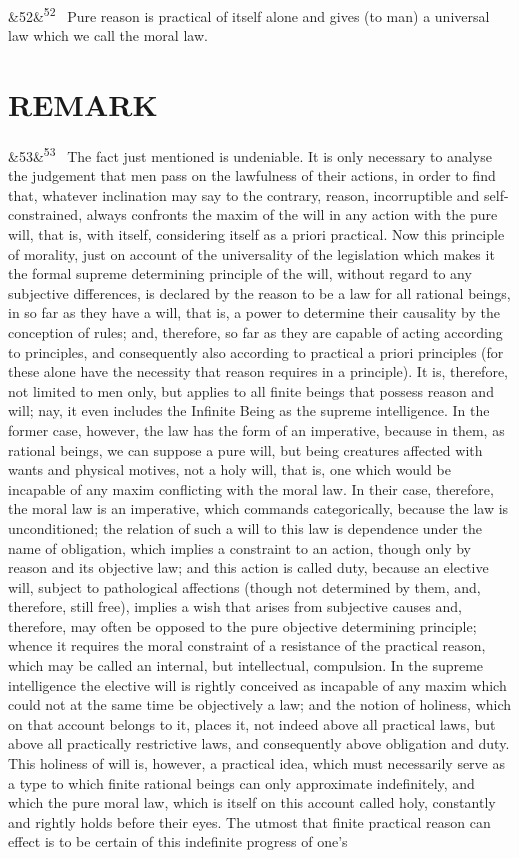\documentclass[12pt]{article}
\newcommand{\para}[1][]{\par\noindent\ifx&#1&\else\textsuperscript{\footnotesize #1}~\fi}
\begin{document}
\para[52] Pure reason is practical of itself alone and gives (to man) a universal law which we call the moral law.

\section*{REMARK}

\para[53] The fact just mentioned is undeniable. It is only necessary to analyse the judgement that men pass on the lawfulness of their actions, in order to find that, whatever inclination may say to the contrary, reason, incorruptible and self-constrained, always confronts the maxim of the will in any action with the pure will, that is, with itself, considering itself as a priori practical. Now this principle of morality, just on account of the universality of the legislation which makes it the formal supreme determining principle of the will, without regard to any subjective differences, is declared by the reason to be a law for all rational beings, in so far as they have a will, that is, a power to determine their causality by the conception of rules; and, therefore, so far as they are capable of acting according to principles, and consequently also according to practical a priori principles (for these alone have the necessity that reason requires in a principle). It is, therefore, not limited to men only, but applies to all finite beings that possess reason and will; nay, it even includes the Infinite Being as the supreme intelligence. In the former case, however, the law has the form of an imperative, because in them, as rational beings, we can suppose a pure will, but being creatures affected with wants and physical motives, not a holy will, that is, one which would be incapable of any maxim conflicting with the moral law. In their case, therefore, the moral law is an imperative, which commands categorically, because the law is unconditioned; the relation of such a will to this law is dependence under the name of obligation, which implies a constraint to an action, though only by reason and its objective law; and this action is called duty, because an elective will, subject to pathological affections (though not determined by them, and, therefore, still free), implies a wish that arises from subjective causes and, therefore, may often be opposed to the pure objective determining principle; whence it requires the moral constraint of a resistance of the practical reason, which may be called an internal, but intellectual, compulsion. In the supreme intelligence the elective will is rightly conceived as incapable of any maxim which could not at the same time be objectively a law; and the notion of holiness, which on that account belongs to it, places it, not indeed above all practical laws, but above all practically restrictive laws, and consequently above obligation and duty. This holiness of will is, however, a practical idea, which must necessarily serve as a type to which finite rational beings can only approximate indefinitely, and which the pure moral law, which is itself on this account called holy, constantly and rightly holds before their eyes. The utmost that finite practical reason can effect is to be certain of this indefinite progress of one's 
\end{document}
